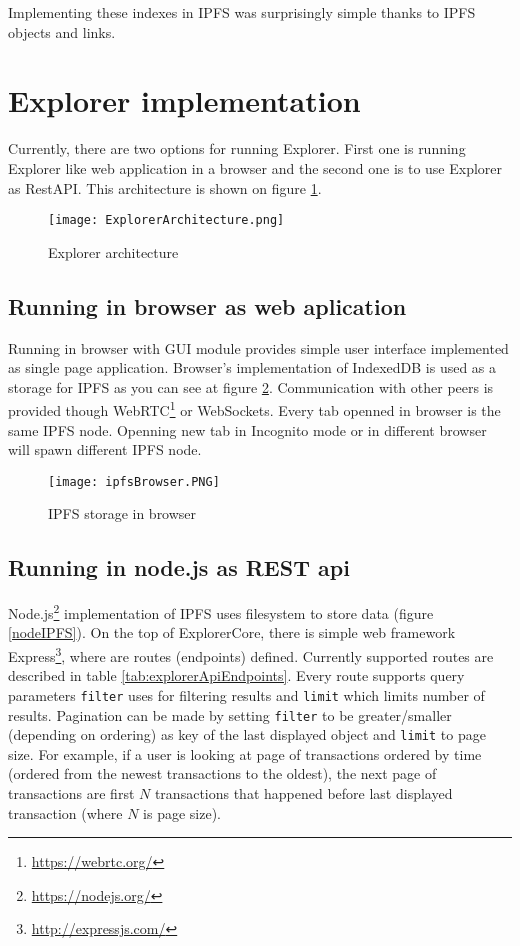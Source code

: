 Implementing these indexes in IPFS was surprisingly simple thanks to IPFS objects and links.


\section{Explorer implementation}
Currently, there are two options for running Explorer. First one is running Explorer like web application in a browser and the second one is to use Explorer as RestAPI. This architecture is shown on figure \ref{ExplorerArchitecture}.

\begin{figure}[h]
    \centering
    \texttt{[image: ExplorerArchitecture.png]}
    \caption{Explorer architecture}
    \label{ExplorerArchitecture}
\end{figure}

\subsection{Running in browser as web aplication}
Running in browser with GUI module provides simple user interface implemented as single page application. Browser's implementation of IndexedDB is used as a storage for IPFS as you can see at figure \ref{browserIPFS}. Communication with other peers is provided though WebRTC\footnote{\url{https://webrtc.org/}} or WebSockets. Every tab openned in browser is the same IPFS node. Openning new tab in Incognito mode or in different browser will spawn different IPFS node.

\begin{figure}[h]
    \centering
    \texttt{[image: ipfsBrowser.PNG]}
    \caption{IPFS storage in browser}
    \label{browserIPFS}
\end{figure}


\subsection{Running in node.js as REST api }
Node.js\footnote{\url{https://nodejs.org/}} implementation of IPFS uses filesystem to store data (figure \ref{nodeIPFS}). On the top of ExplorerCore, there is simple web framework Express\footnote{\url{http://expressjs.com/}}, where are routes (endpoints) defined. Currently supported routes are described in table \ref{tab:explorerApiEndpoints}. Every route supports query parameters \texttt{filter} uses for filtering results and \texttt{limit} which limits number of results. Pagination can be made by setting \texttt{filter} to be greater/smaller (depending on ordering) as key of the last displayed object and \texttt{limit} to page size. For example, if a user is looking at page of transactions ordered by time (ordered from the newest transactions to the oldest), the next page of transactions are first \(N\) transactions that happened before last displayed transaction (where \(N\) is page size).

